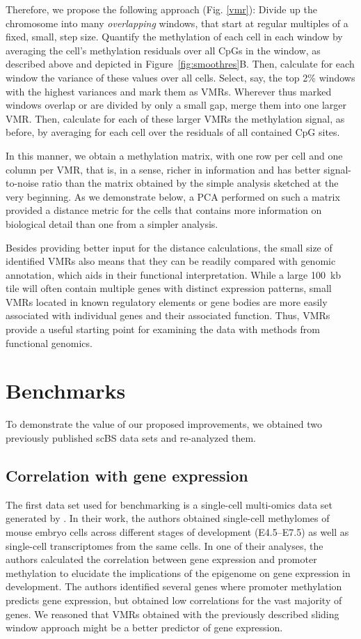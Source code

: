 \documentclass[twocolumn,10pt]{article}
\begin{document}
Therefore, we propose the following approach (Fig. \ref{vmr}): Divide up the chromosome into many \emph{overlapping} windows, that start at regular multiples of a fixed, small, step size. Quantify the methylation of each cell in each window by averaging the cell's methylation residuals over all CpGs in the window, as described above and depicted in Figure\ \ref{fig:smoothres}B. Then, calculate for each window the variance of these values over all cells. Select, say, the top 2\% windows with the highest variances and mark them as VMRs. Wherever thus marked windows overlap or are divided by only a small gap, merge them into one larger VMR. Then, calculate for each of these larger VMRs the methylation signal, as before, by averaging for each cell over the residuals of all contained CpG sites.

In this manner, we obtain a methylation matrix, with one row per cell and one column per VMR, that is, in a sense, richer in information and has better signal-to-noise ratio than the matrix obtained by the simple analysis sketched at the very beginning. As we demonstrate below, a PCA performed on such a matrix provided a distance metric for the cells that contains more information on biological detail than one from a simpler analysis. 

Besides providing better input for the distance calculations, the small size of identified VMRs also means that they can be readily compared with genomic annotation, which aids in their functional interpretation.
While a large 100~kb tile will often contain multiple genes with distinct expression patterns, small VMRs located in known regulatory elements or gene bodies are more easily associated with individual genes and their associated function.
Thus, VMRs provide a useful starting point for examining the data with methods from functional genomics.

\section{Benchmarks}

To demonstrate the value of our proposed improvements, we obtained two previously published scBS data sets and re-analyzed them.

\subsection{Correlation with gene expression}

The first data set used for benchmarking is a single-cell multi-omics data set generated by \citet{argelaguet2019gastru}. In their work, the authors obtained single-cell methylomes of mouse embryo cells across different stages of development (E4.5--E7.5) as well as single-cell transcriptomes from the same cells. In one of their analyses, the authors calculated the correlation between gene expression and promoter methylation to elucidate the implications of the epigenome on gene expression in development. The authors identified several genes where promoter methylation predicts gene expression, but obtained low correlations for the vast majority of genes. We reasoned that VMRs obtained with the previously described sliding window approach might be a better predictor of gene expression. 
\end{document}
